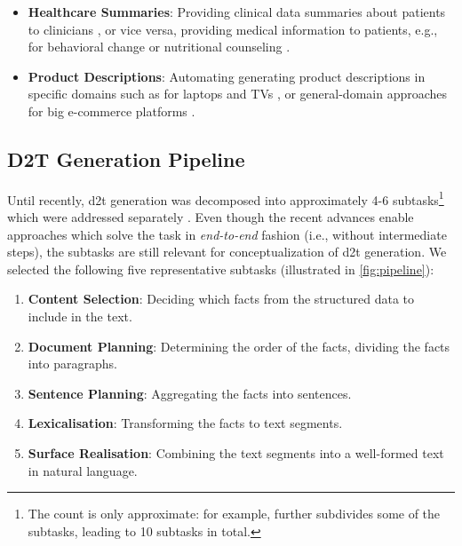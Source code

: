 {\begin{itemize}
  \item \textbf{Healthcare Summaries}: Providing  clinical data summaries about patients to clinicians \cite{portet2009automatic,scott2013data}, or vice versa, providing medical information to patients, e.g., for behavioral change \cite{reiter2003lessons} or nutritional counseling \cite{balloccu-reiter-2022-comparing}.
  \item \textbf{Product Descriptions}: Automating generating product descriptions in specific domains such as for laptops and TVs \cite{wen2015toward,wen2016multi}, or general-domain approaches for big e-commerce platforms \cite{shaoControllableDiverseText2021,kotoCanPretrainedLanguage2022}.
\end{itemize}

\subsection{D2T Generation Pipeline}
\label{sec:d2t-pipeline}


Until recently, \ac{d2t} generation was decomposed into approximately 4-6 subtasks\footnote{The count is only approximate: for example, \citet{milleModD2TMultilayerDataset2023} further subdivides some of the subtasks, leading to 10 subtasks in total.} which were addressed separately \cite{reiterBuildingAppliedNatural1997,reiterArchitectureDatatoTextSystems2007,gattSurveyStateArt2018}. Even though the recent advances enable approaches which  solve the task in \emph{end-to-end} fashion (i.e., without intermediate steps), the subtasks are still relevant for conceptualization of \ac{d2t} generation. We selected the following five representative subtasks (illustrated in \autoref{fig:pipeline}):

\begin{enumerate}
  \item \textbf{Content Selection}: Deciding which facts from the structured data
        to include in the text.
  \item \textbf{Document Planning}: Determining the order of the
        facts, dividing the facts into paragraphs.
  \item \textbf{Sentence Planning}: Aggregating the facts into
        sentences.
  \item \textbf{Lexicalisation}: Transforming the facts to text segments.
  \item \textbf{Surface Realisation}: Combining the text segments into a well-formed text in natural language.
\end{enumerate}


}
